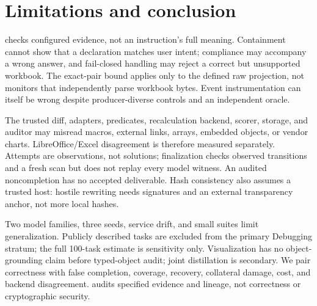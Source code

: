 \section{Limitations and conclusion}

\method{} checks configured evidence, not an instruction's full meaning.
Containment cannot show that a declaration matches user intent; compliance may
accompany a wrong answer, and fail-closed handling may reject a correct but
unsupported workbook. The exact-pair bound applies only to the defined raw
projection, not monitors that independently parse workbook bytes. Event
instrumentation can itself be wrong despite producer-diverse controls and an
independent oracle.

The trusted diff, adapters, predicates, recalculation backend, scorer, storage,
and auditor may misread macros, external links, arrays, embedded objects, or
vendor charts. LibreOffice/Excel disagreement is therefore measured separately.
Attempts are observations, not solutions; finalization checks observed
transitions and a fresh scan but does not replay every model witness. An audited
noncompletion has no accepted deliverable. Hash consistency also assumes a
trusted host: hostile rewriting needs signatures and an external transparency
anchor, not more local hashes.

Two model families, three seeds, service drift, and small suites limit
generalization. Publicly described tasks are excluded from the primary Debugging
stratum; the full 100-task estimate is sensitivity only. Visualization has no
object-grounding claim before typed-object audit; joint distillation is secondary.
We pair correctness with false completion, coverage, recovery, collateral damage,
cost, and backend disagreement. \method{} audits specified evidence and lineage,
not correctness or cryptographic security.
